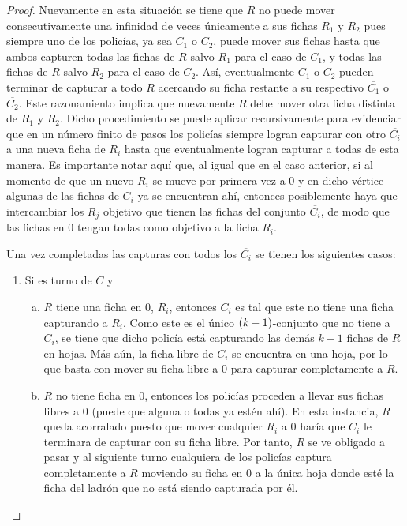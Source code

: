 \begin{proof}
    Nuevamente en esta situaci\'on se tiene que $R$ no puede mover
    consecutivamente una infinidad de veces \'unicamente a sus fichas $R_1$ y
    $R_2$ pues siempre uno de los polic\'ias, ya sea $C_1$ o $C_2$, puede mover
    sus fichas hasta que ambos capturen todas las fichas de $R$ salvo $R_1$ para
    el caso de $C_1$, y todas las fichas de $R$ salvo $R_2$ para el caso de
    $C_2$. As\'i, eventualmente $C_1$ o $C_2$ pueden terminar de capturar a todo
    $R$ acercando su ficha restante a su respectivo $\overline{C_1}$ o
    $\overline{C_2}$. Este razonamiento implica que nuevamente $R$ debe mover
    otra ficha distinta de $R_1$ y $R_2$. Dicho procedimiento se puede aplicar
    recursivamente para evidenciar que en un n\'umero finito de pasos los polic\'ias
    siempre logran capturar con otro $\overline{C_i}$ a una nueva ficha de $R_i$
    hasta que eventualmente logran capturar a todas de esta manera. Es
    importante notar aqu\'i que, al igual que en el caso anterior, si al momento
    de que un nuevo $R_i$ se mueve por primera vez a $0$ y en dicho v\'ertice
    algunas de las fichas de $\overline{C_i}$ ya se encuentran ah\'i, entonces
    posiblemente haya que intercambiar los $R_j$ objetivo que tienen las fichas
    del conjunto $\overline{C_i}$, de modo que las fichas en $0$ tengan todas
    como objetivo a la ficha $R_i$.

    Una vez completadas las capturas con todos los $\overline{C_i}$ se tienen los
    siguientes casos:
    \begin{enumerate}
        \item Si es turno de $C$ y
        \begin{enumerate}[(a)]
            \item $R$ tiene una ficha en $0$, $R_i$, entonces $C_i$ es tal que
            este no tiene una ficha capturando a $R_i$. Como este es el \'unico
            $\left( k-1\right)$-conjunto que no tiene a $C_i$, se tiene que dicho polic\'ia
            est\'a capturando las dem\'as $k-1$ fichas de $R$ en hojas. M\'as a\'un, la
            ficha libre de $C_i$ se encuentra en una hoja, por lo que basta con
            mover su ficha libre a $0$ para capturar completamente a $R$.

            \item $R$ no tiene ficha en $0$, entonces los polic\'ias proceden a
            llevar sus fichas libres a $0$ (puede que alguna o todas ya est\'en
            ah\'i). En esta instancia, $R$ queda acorralado puesto que mover
            cualquier $R_i$ a $0$ har\'ia que $C_i$ le terminara de capturar con
            su ficha libre. Por tanto, $R$ se ve obligado a pasar y al siguiente
            turno cualquiera de los polic\'ias captura completamente a $R$
            moviendo su ficha en $0$ a la \'unica hoja donde est\'e la ficha del
            ladr\'on que no est\'a siendo capturada por \'el.
        \end{enumerate}


\end{enumerate}
\end{proof}
